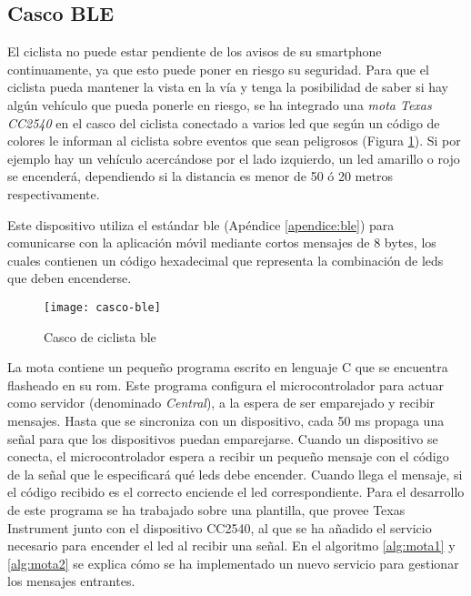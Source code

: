 \FloatBarrier
\subsection{Casco BLE}\label{ssection:cascoBLE}
El ciclista no puede estar pendiente de los avisos de su smartphone
continuamente, ya que esto puede poner en riesgo su seguridad. Para que el
ciclista pueda mantener la vista en la vía y tenga la posibilidad de saber si
hay algún vehículo que pueda ponerle en riesgo, se ha integrado una \emph{mota
Texas CC2540} en el casco del ciclista conectado a varios led que según un
código de colores le informan al ciclista sobre eventos que sean peligrosos
(Figura \ref{fig:casco-ble}). Si por ejemplo hay un vehículo acercándose por el
lado izquierdo, un led amarillo o rojo se encenderá, dependiendo si la
distancia es menor de 50 ó 20 metros respectivamente.

Este dispositivo utiliza el estándar \gls{ble} (Apéndice \ref{apendice:ble})
para comunicarse con la aplicación móvil mediante cortos mensajes de 8 bytes,
los cuales contienen un código hexadecimal que representa la combinación de
leds que deben encenderse.

\begin{figure}[h]
	\begin{center}
		\texttt{[image: casco-ble]}
		\caption{Casco de ciclista \gls{ble}}
		\label{fig:casco-ble}
	\end{center}
\end{figure}

La mota contiene un pequeño programa escrito en	lenguaje C que se encuentra
flasheado en su \gls{rom}. Este programa configura el microcontrolador para
actuar como servidor (denominado \emph{Central}), a la espera de ser
emparejado y recibir mensajes. Hasta que se sincroniza con un dispositivo,
cada 50 ms propaga una señal para que los dispositivos puedan emparejarse.
Cuando un dispositivo se conecta, el microcontrolador espera a recibir un
pequeño mensaje con el código de la señal que le especificará qué	leds debe
encender. Cuando llega el mensaje, si el código recibido es el correcto
enciende el led correspondiente. Para el desarrollo de este programa se ha
trabajado sobre una plantilla, que provee Texas Instrument junto con el
dispositivo CC2540,	al que se ha añadido el servicio necesario para encender
el led al recibir una señal. En el algoritmo \ref{alg:mota1} y \ref{alg:mota2}
se explica cómo se ha implementado un nuevo servicio para gestionar los
mensajes entrantes.


